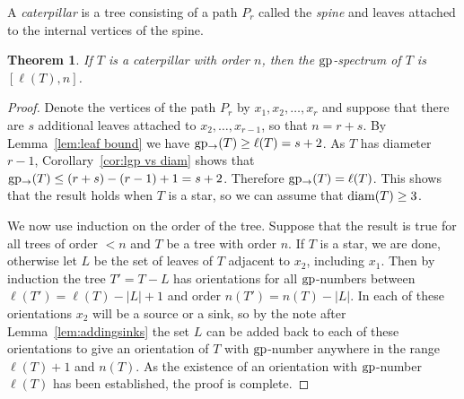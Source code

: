 \documentclass[a4paper,12pt]{article}
\newtheorem{theorem}{Theorem}[section]
\theoremstyle{definition}
\newcommand{\gp}{{\rm gp}}
\newcommand{\diam}{{\rm diam}}
\newcommand{\lgp}{{\rm gp_{\rightarrow }}}
\begin{document}
	A \emph{caterpillar} is a tree consisting of a path $P_r$ called the \emph{spine} and leaves attached to the internal vertices of the spine.
	
	\begin{theorem}\label{thm:caterpillar}
		If $T$ is a caterpillar with order $n$, then the $\gp $-spectrum of $T$ is $[\ell (T),n]$.
	\end{theorem}
	\begin{proof}
		Denote the vertices of the path $P_r$ by $x_1,x_2,\ldots ,x_r$ and suppose that there are $s$ additional leaves attached to $x_2,\ldots ,x_{r-1}$, so that $n = r+s$. By Lemma~\ref{lem:leaf bound} we have $\lgp (T) \geq \ell (T) = s+2$. As $T$ has diameter $r-1$, Corollary~\ref{cor:lgp vs diam} shows that $\lgp (T) \leq (r+s)-(r-1)+1 = s+2$. Therefore $\lgp (T) = \ell (T)$. This shows that the result holds when $T$ is a star, so we can assume that $\diam (T) \geq 3$.
		
		We now use induction on the order of the tree. Suppose that the result is true for all trees of order $< n$ and $T$ be a tree with order $n$. If $T$ is a star, we are done, otherwise let $L$ be the set of leaves of $T$ adjacent to $x_2$, including $x_1$. Then by induction the tree $T' = T-L$ has orientations for all $\gp $-numbers between $\ell (T') = \ell (T)-|L|+1$ and order $n(T') = n(T)-|L|$. In each of these orientations $x_2$ will be a source or a sink, so by the note after Lemma~\ref{lem:addingsinks} the set $L$ can be added back to each of these orientations to give an orientation of $T$ with $\gp $-number anywhere in the range $\ell (T)+1$ and $n(T)$. As the existence of an orientation with $\gp $-number $\ell (T)$ has been established, the proof is complete.
	\end{proof}
	
	
	
	
	
\end{document}
